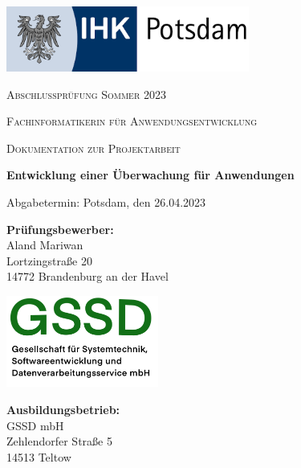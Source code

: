 \begin{titlepage}
	\centering
	\includegraphics[width=80mm]{img/ihkpotsdam.png}\\[8ex]
	{\scshape Abschlussprüfung Sommer 2023 \par}
	\vspace{1cm}
	{\scshape Fachinformatikerin für Anwendungsentwicklung\par}
	\vspace{0,5cm}
	{\scshape Dokumentation zur Projektarbeit\par}
	\vspace{1cm}
	{\huge\bfseries {Entwicklung einer Überwachung für Anwendungen}\par}
	\vspace{1cm}

	\begin{center}
	Abgabetermin: Potsdam, den 26.04.2023
	\end{center}
	\vspace{0,5cm}
	\begin{center}
	\small{\textbf{Prüfungsbewerber:}} \\
	\small{Aland Mariwan}\\
	\small{Lortzingstraße 20}\\
	\small{14772 Brandenburg an der Havel}
	\end{center}

	\includegraphics[width=50mm]{img/main_logo.png}

	\begin{center}
	\small{\textbf{Ausbildungsbetrieb:}} \\
	\small{GSSD mbH}\\
	\small{Zehlendorfer Straße 5}\\
	\small{14513 Teltow}
	\end{center}

\end{titlepage}
